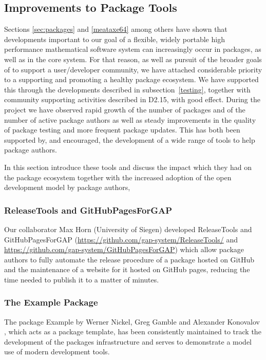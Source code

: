 \subsection{Improvements to \GAP Package Tools}\label{sec:package-tools}

Sections \ref{sec:packages} and \ref{meataxe64} among others have shown
that developments important to our goal of a flexible, widely portable high performance
mathematical software system can increasingly occur in packages, as
well as in the core \GAP system. For that reason, as well as pursuit
of the broader goals of \ODK to support a user/developer community, we have attached
considerable priority to a supporting and promoting a healthy \GAP
package ecosystem. We have supported this through the developments
described in subsection~\ref{testing}, together with community
supporting activities described in D2.15,  with
good effect. During the \ODK
project we have observed rapid growth of the number of \GAP packages
and of the number of active package
authors as well as steady improvements in the quality of package testing and more frequent
package updates. This has both been supported by, and encouraged, the
development of a wide range of tools to help package authors.

In this section introduce these tools and discuss the
impact which they had on the package ecosystem together with the increased
adoption of the open development model by package authors,

\subsubsection{ReleaseTools and GitHubPagesForGAP}
Our collaborator Max Horn (University of Siegen) developed {\sf ReleaseTools}
and {\sf GitHubPagesForGAP} (\url{https://github.com/gap-system/ReleaseTools/}
and \url{https://github.com/gap-system/GitHubPagesForGAP}) which allow package
authors to fully automate the release procedure of a \GAP package hosted on GitHub
and the maintenance of a website for it hosted on GitHub pages,
reducing the time needed to publish it to a matter of minutes.

\subsubsection{The Example Package}
The \GAP package {\sf Example} by Werner Nickel, Greg Gamble and
Alexander Konovalov \cite{example}, which acts as a package template,
has been consistently maintained to track the development of
the packages infrastructure and serves to demonstrate a model use of modern
development tools.

